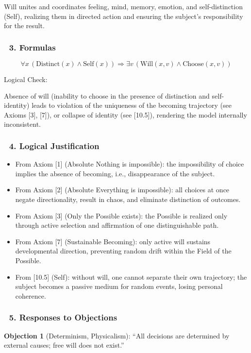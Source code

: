 \documentclass[12pt]{article}
\begin{document}
Will unites and coordinates feeling, mind, memory, emotion, and self-distinction (Self), realizing them in directed action and ensuring the subject’s responsibility for the result.

\subsubsection*{🔹 3. Formulas}

\[
\forall x\, (\text{Distinct}(x) \land \text{Self}(x)) \Rightarrow \exists v\, (\text{Will}(x, v) \land \text{Choose}(x, v))
\]

Logical Check:

Absence of will (inability to choose in the presence of distinction and self-identity) leads to violation of the uniqueness of the becoming trajectory (see Axioms [3], [7]), or collapse of identity (see [10.5]), rendering the model internally inconsistent.

\subsubsection*{🔹 4. Logical Justification}

\begin{itemize}
\item From Axiom [1] (Absolute Nothing is impossible): the impossibility of choice implies the absence of becoming, i.e., disappearance of the subject.
\item From Axiom [2] (Absolute Everything is impossible): all choices at once negate directionality, result in chaos, and eliminate distinction of outcomes.
\item From Axiom [3] (Only the Possible exists): the Possible is realized only through active selection and affirmation of one distinguishable path.
\item From Axiom [7] (Sustainable Becoming): only active will sustains developmental direction, preventing random drift within the Field of the Possible.
\item From [10.5] (Self): without will, one cannot separate their own trajectory; the subject becomes a passive medium for random events, losing personal coherence.
\end{itemize}

\subsubsection*{🔹 5. Responses to Objections}

\textbf{Objection 1} (Determinism, Physicalism): ``All decisions are determined by external causes; free will does not exist.''
\end{document}
